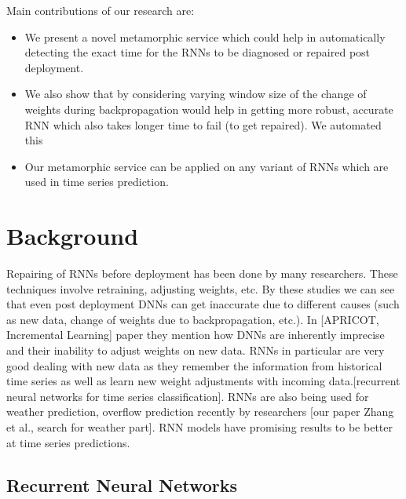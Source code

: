 \documentclass[sigconf,authordraft]{acmart}
\begin{document}
Main contributions of our research are:
\begin{itemize}
  \item We present a novel metamorphic service which could help in automatically detecting the exact time for the RNNs to be diagnosed or repaired post deployment.
  \item We also show that by considering varying window size of the change of weights during backpropagation would help in getting more robust, accurate RNN which also takes longer time to fail (to get repaired). We automated this 
  \item Our metamorphic service can be applied on any variant of RNNs  which are used in time series prediction. %
\end{itemize}



\section{Background}
Repairing of RNNs before deployment has been done by many researchers. These techniques involve retraining, adjusting weights, etc. By these studies we can see that even post deployment DNNs can get inaccurate due to different causes (such as new data, change of weights due to backpropagation, etc.). In [APRICOT, Incremental Learning] paper they mention how DNNs are inherently imprecise and their inability to adjust weights on new data. RNNs in particular are very good dealing with new data as they remember the information from historical time series as well as learn new weight adjustments with incoming data.[recurrent neural networks for time series classification]. RNNs are also being used for weather prediction, overflow prediction recently by researchers [our paper Zhang et al., search for weather part]. RNN models have promising results to be better at time series predictions.

\subsection{Recurrent Neural Networks}


\end{document}

